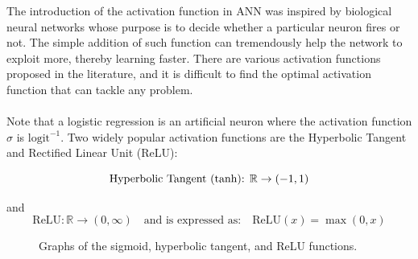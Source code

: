 \documentclass[../main.tex]{subfiles}
\begin{document}
 
 \noindent The introduction of the activation function in ANN was inspired by biological neural networks whose purpose is to decide whether a particular neuron fires or not. The simple addition of such function can tremendously help the network to exploit more, thereby learning faster. There are various activation functions proposed in the literature, and it is difficult to find the optimal activation function that can tackle any problem. \\ \\ 
	 	\noindent Note that a logistic regression is an artificial neuron where the activation function  $\sigma$ is $\text{logit}^{-1}$. Two widely popular activation functions are the Hyperbolic Tangent and Rectified Linear Unit (ReLU):
	 	
	
	
	\[
	\text{Hyperbolic Tangent (\text{tanh}): } \mathbb{R} \to (-1,1)
	\]
	
	

	 and 
	  \[
	 \text{ReLU}: \mathbb{R} \to (0,\infty)
	 \quad \text{and is expressed as:} \quad
	 \text{ReLU}(x) = \max(0,x)
	 \]
	 
	 
	 
	 \begin{figure}[h]
	 	\centering
	 	
	 	\hspace{1cm}
	 	\hspace{1cm}
	 	
	 	\caption{Graphs of the sigmoid, hyperbolic tangent, and ReLU functions.}
	 \end{figure}
	 	
\end{document}
